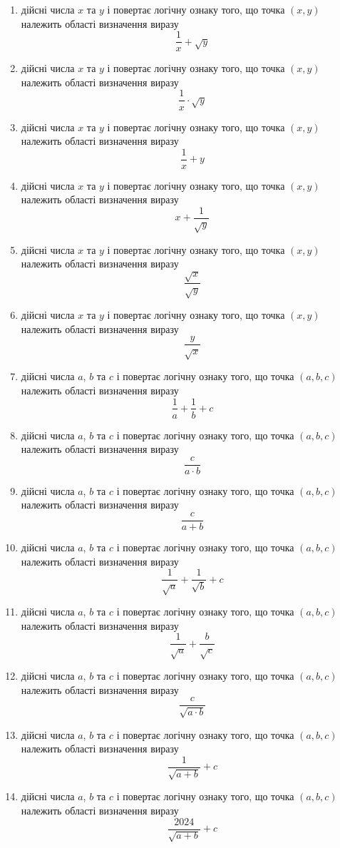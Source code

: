 \documentclass[12pt,a4paper]{article}
\begin{document}
\begin{enumerate}
    \item дійсні числа $x$ та $y$ і повертає логічну ознаку того, що точка $(x, y)$ належить області визначення виразу $$\frac{1}{x} + \sqrt{y}$$
    \item дійсні числа $x$ та $y$ і повертає логічну ознаку того, що точка $(x, y)$ належить області визначення виразу $$\frac{1}{x} \cdot \sqrt{y}$$
    \item дійсні числа $x$ та $y$ і повертає логічну ознаку того, що точка $(x, y)$ належить області визначення виразу $$\frac{1}{x} + y$$
    \item дійсні числа $x$ та $y$ і повертає логічну ознаку того, що точка $(x, y)$ належить області визначення виразу $$x + \frac{1}{\sqrt{y}}$$
    \item дійсні числа $x$ та $y$ і повертає логічну ознаку того, що точка $(x, y)$ належить області визначення виразу $$\frac{\sqrt{x}}{\sqrt{y}}$$
    \item дійсні числа $x$ та $y$ і повертає логічну ознаку того, що точка $(x, y)$ належить області визначення виразу $$\frac{y}{\sqrt{x}}$$

    \item дійсні числа $a$, $b$ та $c$ і повертає логічну ознаку того, що точка $(a, b, c)$ належить області визначення виразу $$\frac{1}{a} + \frac{1}{b} + c$$
    \item дійсні числа $a$, $b$ та $c$ і повертає логічну ознаку того, що точка $(a, b, c)$ належить області визначення виразу $$\frac{c}{a \cdot b}$$
    \item дійсні числа $a$, $b$ та $c$ і повертає логічну ознаку того, що точка $(a, b, c)$ належить області визначення виразу $$\frac{c}{a + b}$$
    \item дійсні числа $a$, $b$ та $c$ і повертає логічну ознаку того, що точка $(a, b, c)$ належить області визначення виразу $$\frac{1}{\sqrt{a}} + \frac{1}{\sqrt{b}} + c$$
    \item дійсні числа $a$, $b$ та $c$ і повертає логічну ознаку того, що точка $(a, b, c)$ належить області визначення виразу $$\frac{1}{\sqrt{a}} + \frac{b}{\sqrt{c}}$$
    \item дійсні числа $a$, $b$ та $c$ і повертає логічну ознаку того, що точка $(a, b, c)$ належить області визначення виразу $$\frac{c}{\sqrt{a \cdot b}}$$
    \item дійсні числа $a$, $b$ та $c$ і повертає логічну ознаку того, що точка $(a, b, c)$ належить області визначення виразу $$\frac{1}{\sqrt{a + b}} + c$$
    \item дійсні числа $a$, $b$ та $c$ і повертає логічну ознаку того, що точка $(a, b, c)$ належить області визначення виразу $$\frac{2024}{\sqrt{a + b}} + c$$


\end{enumerate}
\end{document}
